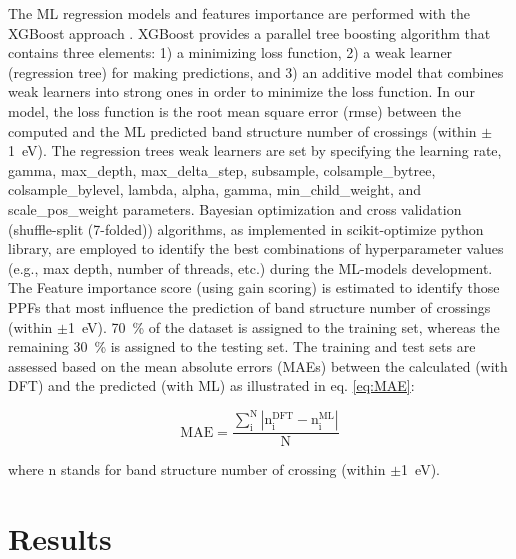 \documentclass[article]{elsarticle}
\begin{document}
The ML regression models and features importance are performed with the XGBoost approach \cite{chen2015xgboost,chen2016xgboost}. XGBoost provides a parallel tree boosting algorithm \cite{chen2008trada} that contains three elements: 1) a minimizing loss function, 2) a weak learner (regression tree) for making predictions, and 3) an additive model that combines weak learners into strong ones in order to minimize the loss function. In our model, the loss function is the root mean square error (rmse) between the computed and the ML predicted band structure number of crossings (within $\pm$\SI{1}{\electronvolt}). The regression trees weak learners are set by specifying the learning rate, gamma, max\_depth, max\_delta\_step, subsample, colsample\_bytree, colsample\_bylevel, lambda, alpha, gamma, min\_child\_weight, and scale\_pos\_weight parameters. Bayesian optimization and cross validation (shuffle-split (7-folded)) algorithms, as implemented in scikit-optimize python library,\cite{head_tim_2020_4014775} are employed to identify the best combinations of hyperparameter values (e.g., max depth, number of threads, etc.) during the ML-models development. The Feature importance score (using gain scoring) is estimated to identify those PPFs that most influence the prediction of band structure number of crossings (within $\pm$\SI{1}{\electronvolt}). %
\SI{70}{\percent} of the dataset is assigned to the training set, whereas the remaining \SI{30}{\percent} is assigned to the testing set. The training and test sets are assessed based on the mean absolute errors (MAEs) between the calculated (with DFT) and the predicted (with ML) as illustrated in eq. \ref{eq:MAE}:

\begin{equation} \label{eq:MAE}
\mathrm{
MAE = \frac{\sum_i^N \left|n_i^{DFT} - n_i^{ML}\right|}{N}
}
\end{equation}

\noindent where $\mathrm{n}$ stands for band structure number of crossing (within $\pm$\SI{1}{\electronvolt}).

\section{Results}
\end{document}
